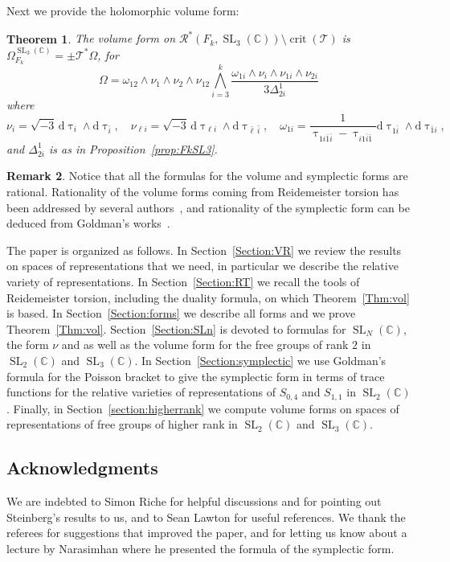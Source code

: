 \documentclass[11pt]{article}
\newtheorem{theo}{Theorem}[section]
\theoremstyle{definition}
\newtheorem{rema}[theo]{Remark}
\numberwithin{equation}{section}
\numberwithin{figure}{section}
\numberwithin{table}{section}
\DeclareMathOperator{\SL}{SL}
\DeclareMathOperator{\crit}{crit}
\newcommand{\Rcal}{\mathcal{R}}
\newcommand{\Tcal}{\mathcal{T}}
\newcommand{\Cbb}{\mathbb{C}}
\newcommand*{\dd}{\mathrm{d}}
\begin{document}
Next we provide the holomorphic volume form:

\begin{theo}\label{thm:FkSL3}
The volume form on $\Rcal^*(F_k,\SL_3(\Cbb))\setminus \crit(\Tcal)$ is $ \Omega_{F_k}^{\SL_3(\Cbb)}=\pm \Tcal^* \Omega$, for
\[
\Omega =\omega_{12}\wedge\nu_1\wedge\nu_2\wedge\nu_{12}\bigwedge_{i=3}^k\frac{\omega_{1i}\wedge \nu_i\wedge \nu_{1i}\wedge \nu_{2i} }{3 \varDelta^1_{2i}}
\]
where
\[
\nu_i = \sqrt{-3}\, \dd \uptau_i\wedge \dd \uptau_{\bar i}, \quad
\nu_{\ell i} = \sqrt{-3}\, \dd \uptau_{\ell i}\wedge \dd \uptau_{\bar\ell \, \bar i}, \quad
\omega_{1i} = \frac1{ {\uptau_{1i\bar 1\bar i}- \uptau_{i1\bar i\bar 1} } } {\dd \uptau_{1\bar i}\wedge \dd \uptau_{\bar 1 i} },
\]
and $ \varDelta^1_{2i}$ is as in Proposition~\ref{prop:FkSL3}.
\end{theo}


\begin{rema}
Notice that all the formulas for the volume and symplectic forms are rational. Rationality of the volume forms coming from Reidemeister torsion has been addressed by several authors~\cite{Benard1, Benard2, DuboisGaroufalidis, Marche2016, Porti}, and rationality of the symplectic form can be deduced from Goldman's works~\cite{GoldmanHamiltonian,GoldmanComplex}.
\end{rema}



The paper is organized as follows. In Section~\ref{Section:VR} we review the results on spaces of representations that we need, in particular we describe the relative variety of representations. In Section~\ref{Section:RT} we recall the tools of Reidemeister torsion, including the duality formula, on which Theorem~\ref{Thm:vol} is based. In Section~\ref{Section:forms} we describe all forms and we prove Theorem~\ref{Thm:vol}. Section~\ref{Section:SLn} is devoted to formulas for $\SL_N (\Cbb)$, the form $\nu$ and as well as the volume form for the free groups of rank $2$ in $\SL_2(\Cbb)$ and $\SL_3(\Cbb)$. In Section~\ref{Section:symplectic} we use Goldman's formula for the Poisson bracket to give the symplectic form in terms of trace functions for the relative varieties of representations of $S_{0,4}$ and $S_{1,1}$ in $\SL_2(\Cbb)$. Finally, in Section~\ref{section:higherrank} we compute volume forms on spaces of representations of free groups of higher rank in $\SL_2(\Cbb)$ and $\SL_3(\Cbb)$.


\subsection*{Acknowledgments}%
We are indebted to Simon Riche for helpful discussions and for pointing out Steinberg's results to us, and to Sean Lawton for useful references. We thank the referees for suggestions that improved the paper, and for letting us know about a lecture by Narasimhan where he presented the formula of the symplectic form.
\end{document}
